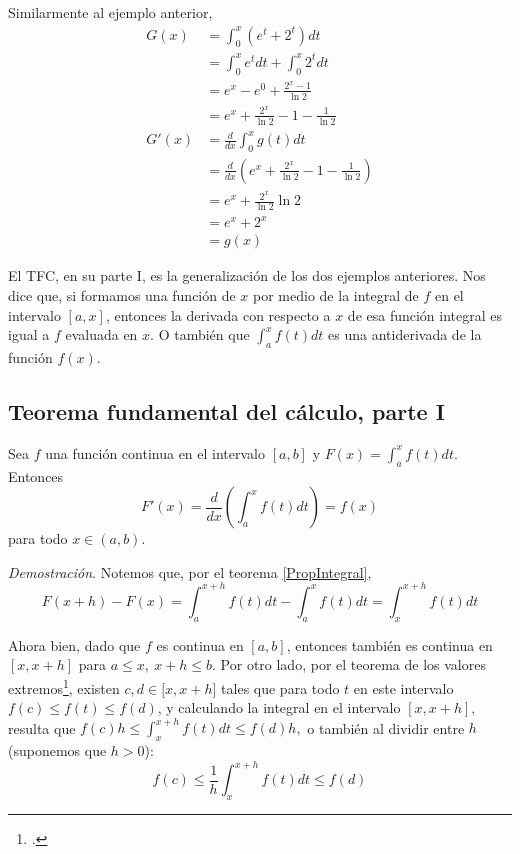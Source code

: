 \begin{parrafonumerado}
\item Similarmente al ejemplo anterior,
\begin{align*}
  G(x)
  &=\int_{0}^{x}(e^{t}+2^{t})dt\\
  &=\int_{0}^{x}e^{t}dt+\int_{0}^{x}2^{t}dt\\
  &=e^{x}-e^{0}+\frac{2^{x}-1}{\ln 2}\\
  &=e^{x}+\frac{2^{x}}{\ln 2}-1-\frac{1}{\ln 2}\\[1em]
  G'(x) &=\frac{d}{dx}\int_{0}^{x}g(t)dt\\
  &=\frac{d}{dx}\left(e^{x}+\frac{2^{x}}{\ln 2}-1-\frac{1}{\ln 2}\right)\\
  &=e^{x}+\frac{2^{x}}{\ln 2}\ln 2\\
  &=e^{x}+2^{x}\\
  &=g(x)
\end{align*}

\end{parrafonumerado}

El TFC, en su parte I, es la generalización de los dos ejemplos anteriores. Nos dice que, si formamos una función de $x$ por medio de la integral de $f$ en el intervalo $[a,x]$, entonces la derivada con respecto a $x$ de esa función integral es igual a $f$ evaluada en $x$. O también que $\int_{a}^{x}f(t)dt$ es una antiderivada de la función $f(x)$.

\subsection{Teorema fundamental del cálculo, parte I}

Sea $f$ una función continua en el intervalo $[a,b] $ y $F(x)=\int_{a}^{x}f(t)dt$. Entonces
\[
F'(x)=\frac{d}{dx}\left(\int_{a}^{x}f(t)dt\right)=f(x)
\]
para todo $x\in \left( a,b\right)$.

\textit{Demostración}. Notemos que, por el teorema \ref{PropIntegral},
\[
F(x+h)-F(x)=\int_{a}^{x+h}f(t)dt-\int_{a}^{x}f(t)dt=\int_{x}^{x+h}f(t)dt
\]

Ahora bien, dado que $f$ es continua en $[a,b]$, entonces también es continua en $\left[ x,x+h\right]$ para $a\leq x,\ x+h\leq b$. Por otro lado, por el teorema de los valores extremos\footnote{\textcite{Zill_Wright_2011}.}, existen $c,d\in \lbrack x,x+h]$ tales que para todo $t$ en este intervalo $f\left( c\right) \leq f(t)\leq f(d)$, y calculando la integral en el intervalo $[x,x+h],$ resulta que $f(c)h\leq \int_{x}^{x+h}f(t)dt\leq f(d)h,$ o también al dividir entre $h$ (suponemos que $h>0$):
\begin{equation}\label{TeorFCParteI}
f(c)\leq \frac{1}{h}\int_{x}^{x+h}f(t)dt\leq f(d)
\end{equation}

